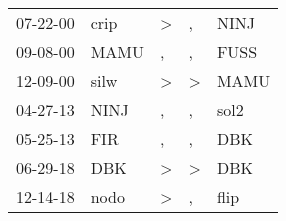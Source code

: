 \begin{supertabular}{lllll}
 07-22-00 &  crip &  \textgreater &             , &  NINJ \\
 09-08-00 &  MAMU &             , &             , &  FUSS \\
 12-09-00 &  silw &  \textgreater &  \textgreater &  MAMU \\
 04-27-13 &  NINJ &             , &             , &  sol2 \\
 05-25-13 &   FIR &             , &             , &   DBK \\
 06-29-18 &   DBK &  \textgreater &  \textgreater &   DBK \\
 12-14-18 &  nodo &  \textgreater &             , &  flip \\
\end{supertabular}
